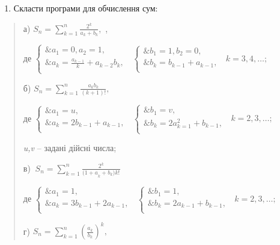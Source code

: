 \documentclass[]{article}
\begin{document}
\begin{enumerate}
\def\labelenumi{\arabic{enumi})}
\item
  Скласти програми для обчислення сум:
\end{enumerate}

\begin{quote}
а) \(S_{n} = \sum_{k = 1}^{n}\frac{2^{k}}{a_{k} + b_{k}},\) ,

де \(\left\{ \begin{matrix}
\& a_{1} = 0,a_{2} = 1, \\
\& a_{k} = \frac{a_{k - 1}}{k} + a_{k - 2}b_{k}, \\
\end{matrix} \right.\ \) \(\left\{ \begin{matrix}
\& b_{1} = 1,b_{2} = 0, \\
\& b_{k} = b_{k - 1} + a_{k - 1}, \\
\end{matrix} \right.\ \) \(k = 3,4,\ldots;\)

б) \(S_{n} = \sum_{k = 1}^{n}\frac{a_{k}b_{k}}{(k + 1)!},\)

де \(\left\{ \begin{matrix}
\& a_{1} = u, \\
\& a_{k} = 2b_{k - 1} + a_{k - 1}, \\
\end{matrix} \right.\ \) \(\left\{ \begin{matrix}
\& b_{1} = v, \\
\& b_{k} = 2a_{k = 1}^{2} + b_{k - 1}, \\
\end{matrix} \right.\ \) \(k = 2,3,\ldots;\)

\emph{u,v} -- задані дійсні числа;

в)
\(\ S_{n} = \sum_{k = 1}^{n}\frac{2^{k}}{{(1 + a}_{k} + b_{k}){k!}^{}}\)

де \(\left\{ \begin{matrix}
\& a_{1} = 1, \\
\& a_{k} = 3b_{k - 1} + 2a_{k - 1}, \\
\end{matrix} \right.\ \) \(\left\{ \begin{matrix}
\& b_{1} = 1, \\
\& b_{k} = 2a_{k - 1} + b_{k - 1}, \\
\end{matrix} \right.\ \) \(k = 2,3,\ldots;\)

г) \(S_{n} = \sum_{k = 1}^{n}\left( \frac{a_{k}}{b_{k}} \right)^{k},\)


\end{quote}
\end{document}

